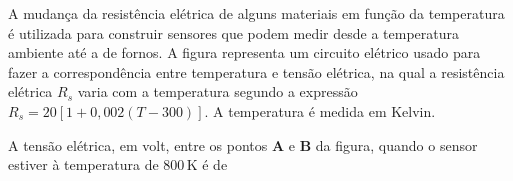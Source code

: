 A mudança da resistência elétrica de alguns materiais em função da temperatura é utilizada para construir sensores que podem medir desde a temperatura ambiente até a de fornos. A figura representa um circuito elétrico usado para fazer a correspondência entre temperatura e tensão elétrica, na qual a resistência elétrica $R_s$ varia com a temperatura segundo a expressão $R_s = 20[1 + 0{,}002(T - 300)]$. A temperatura é medida em Kelvin.\par
{}
A tensão elétrica, em volt, entre os pontos \textbf{A} e \textbf{B} da figura, quando o sensor estiver à temperatura de 800\,K é de\par
\begin{altlinha}
%
%
%
%
\end{altlinha}
